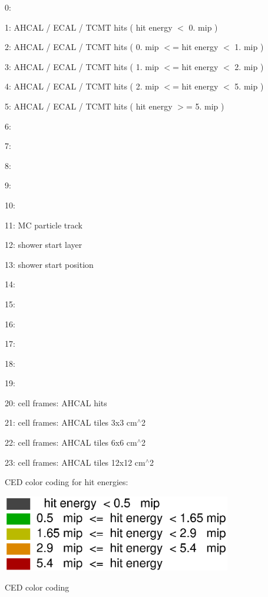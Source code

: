 \begin{DoxyItemize}
\item 0\-:
\item 1\-: A\-H\-C\-A\-L / E\-C\-A\-L / T\-C\-M\-T hits ( hit energy $<$ 0. mip )
\item 2\-: A\-H\-C\-A\-L / E\-C\-A\-L / T\-C\-M\-T hits ( 0. mip $<$= hit energy $<$ 1. mip )
\item 3\-: A\-H\-C\-A\-L / E\-C\-A\-L / T\-C\-M\-T hits ( 1. mip $<$= hit energy $<$ 2. mip )
\item 4\-: A\-H\-C\-A\-L / E\-C\-A\-L / T\-C\-M\-T hits ( 2. mip $<$= hit energy $<$ 5. mip )
\item 5\-: A\-H\-C\-A\-L / E\-C\-A\-L / T\-C\-M\-T hits ( hit energy $>$= 5. mip )
\item 6\-:
\item 7\-:
\item 8\-:
\item 9\-:
\item 10\-:
\item 11\-: M\-C particle track
\item 12\-: shower start layer
\item 13\-: shower start position
\item 14\-:
\item 15\-:
\item 16\-:
\item 17\-:
\item 18\-:
\item 19\-:
\item 20\-: cell frames\-: A\-H\-C\-A\-L hits
\item 21\-: cell frames\-: A\-H\-C\-A\-L tiles 3x3 cm$^\wedge$2
\item 22\-: cell frames\-: A\-H\-C\-A\-L tiles 6x6 cm$^\wedge$2
\item 23\-: cell frames\-: A\-H\-C\-A\-L tiles 12x12 cm$^\wedge$2
\end{DoxyItemize}

C\-E\-D color coding for hit energies\-:

 
\begin{DoxyImage}
\includegraphics[width=10cm]{EventDisplayProcessor_colorCode}
\caption{C\-E\-D color coding}
\end{DoxyImage}



